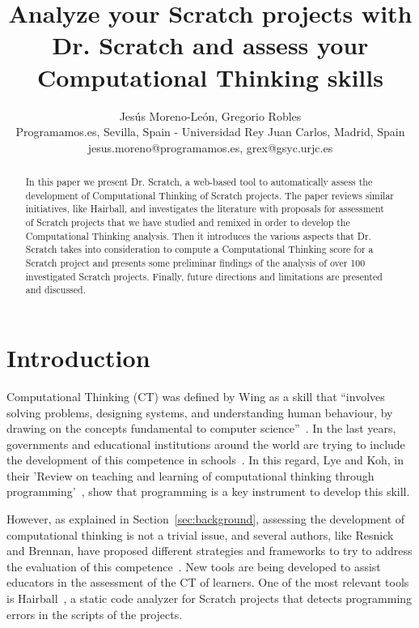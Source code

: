 \documentclass[a4paper,11pt]{article}
\title{Analyze your Scratch projects with Dr. Scratch and assess your Computational Thinking skills}
\author{Jesús Moreno-León, Gregorio Robles \\ Programamos.es, Sevilla, Spain - Universidad Rey Juan Carlos, Madrid, Spain \\ jesus.moreno@programamos.es, grex@gsyc.urjc.es}
\begin{document}
\maketitle

\begin{abstract}
In this paper we present Dr. Scratch, a web-based tool to automatically assess the development of Computational Thinking of Scratch projects. The paper reviews similar initiatives, like Hairball, and investigates the literature with proposals for assessment of Scratch projects that we have studied and remixed in order to develop the Computational Thinking analysis. Then it introduces the various aspects that Dr. Scratch takes into consideration to compute a Computational Thinking score for a Scratch project and presents some preliminar findings of the analysis of over 100 investigated Scratch projects. Finally, future directions and limitations are presented and discussed.

\end{abstract}

\section{Introduction}

Computational Thinking (CT) was defined by Wing as a skill that ``involves solving problems, designing systems, and understanding human behaviour, by drawing on the concepts fundamental to computer science''~\cite{wing2006computational}. In the last years, governments and educational institutions around the world are trying to include the development of this competence in schools~\cite{euschoolnet}. In this regard, Lye and Koh, in their 'Review on teaching and learning of computational thinking through programming'~\cite{lye2014review}, show that programming is a key instrument to develop this skill.

However, as explained in Section~\ref{sec:background}, assessing the development of computational thinking is not a trivial issue, and several authors, like Resnick and Brennan, have proposed different strategies and frameworks to try to address the evaluation of this competence~\cite{brennan2012new}. New tools are being developed to assist educators in the assessment of the CT of learners. One of the most relevant tools is Hairball~\cite{boe2013hairball}, a static code analyzer for Scratch projects that detects programming errors in the scripts of the projects.
\end{document}
